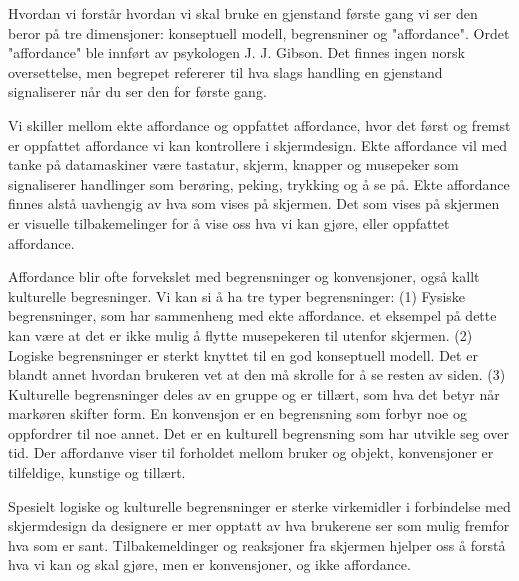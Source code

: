 \noindent
Hvordan vi forstår hvordan vi skal bruke en gjenstand første gang vi ser den beror på tre dimensjoner: konseptuell modell, begrensniner og "affordance". Ordet "affordance" ble innført av psykologen J. J. Gibson. Det finnes ingen norsk oversettelse, men begrepet refererer til hva slags handling en gjenstand signaliserer når du ser den for første gang.\cite{Norman99}

\noindent
Vi skiller mellom ekte affordance og oppfattet affordance, hvor det først og fremst er oppfattet affordance vi kan kontrollere i skjermdesign. Ekte affordance vil med tanke på datamaskiner være tastatur, skjerm, knapper og musepeker som signaliserer handlinger som berøring, peking, trykking og å se på. Ekte affordance finnes alstå uavhengig av hva som vises på skjermen. Det som vises på skjermen er visuelle tilbakemelinger for å vise oss hva vi kan gjøre, eller oppfattet affordance.\cite{Norman99}

\noindent
Affordance blir ofte forvekslet med begrensninger og konvensjoner, også kallt kulturelle begresninger. Vi kan si å ha tre typer begrensninger: (1) Fysiske begrensninger, som har sammenheng med ekte affordance. et eksempel på dette kan være at det er ikke mulig å flytte musepekeren til utenfor skjermen. (2) Logiske begrensninger er sterkt knyttet til en god konseptuell modell. Det er blandt annet hvordan brukeren vet at den må skrolle for å se resten av siden. (3) Kulturelle begrensninger deles av en gruppe og er tillært, som hva det betyr når markøren skifter form. En konvensjon er en begrensning som forbyr noe og oppfordrer til noe annet. Det er en kulturell begrensning som har utvikle seg over tid. Der affordanve viser til forholdet mellom bruker og objekt, konvensjoner er tilfeldige, kunstige og tillært.\cite{Norman99}

\noindent
Spesielt logiske og kulturelle begrensninger er sterke virkemidler i forbindelse med skjermdesign da designere er mer opptatt av hva brukerene ser som mulig fremfor hva som er sant. Tilbakemeldinger og reaksjoner fra skjermen hjelper oss å forstå hva vi kan og skal gjøre, men er konvensjoner, og ikke affordance.\cite{Norman99}